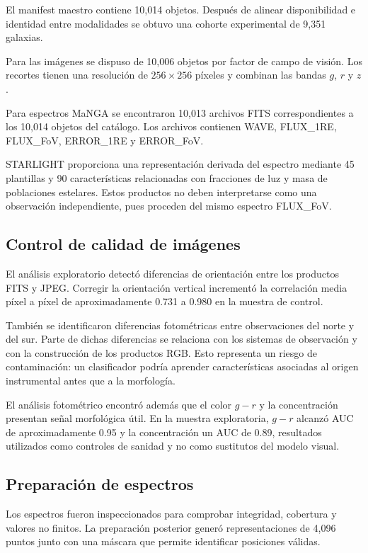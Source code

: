 \documentclass[letterpaper,11pt]{article}
\begin{document}
El manifest maestro contiene 10,014 objetos. Después de alinear disponibilidad e identidad entre modalidades se obtuvo una cohorte experimental de 9,351 galaxias. 

Para las imágenes se dispuso de 10,006 objetos por factor de campo de visión. Los recortes tienen una resolución de $256\times256$ píxeles y combinan las bandas $g$, $r$ y $z$. 

Para espectros MaNGA se encontraron 10,013 archivos FITS correspondientes a los 10,014 objetos del catálogo. Los archivos contienen WAVE, FLUX\_1RE, FLUX\_FoV, ERROR\_1RE y ERROR\_FoV. 

STARLIGHT proporciona una representación derivada del espectro mediante 45 plantillas y 90 características relacionadas con fracciones de luz y masa de poblaciones estelares. Estos productos no deben interpretarse como una observación independiente, pues proceden del mismo espectro FLUX\_FoV.

\subsection{Control de calidad de imágenes} 

El análisis exploratorio detectó diferencias de orientación entre los productos FITS y JPEG. Corregir la orientación vertical incrementó la correlación media píxel a píxel de aproximadamente 0.731 a 0.980 en la muestra de control. 

También se identificaron diferencias fotométricas entre observaciones del norte y del sur. Parte de dichas diferencias se relaciona con los sistemas de observación y con la construcción de los productos RGB. Esto representa un riesgo de contaminación: un clasificador podría aprender características asociadas al origen instrumental antes que a la morfología. 

El análisis fotométrico encontró además que el color $g-r$ y la concentración presentan señal morfológica útil. En la muestra exploratoria, $g-r$ alcanzó AUC de aproximadamente 0.95 y la concentración un AUC de 0.89, resultados utilizados como controles de sanidad y no como sustitutos del modelo visual.

\subsection{Preparación de espectros} 

Los espectros fueron inspeccionados para comprobar integridad, cobertura y valores no finitos. La preparación posterior generó representaciones de 4,096 puntos junto con una máscara que permite identificar posiciones válidas. 
\end{document}
